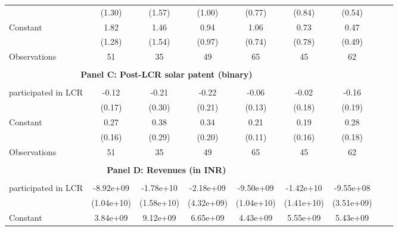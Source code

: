 \begin{table}[htbp]
\begin{tabular}{l*{8}{c}}
                    &      (1.30)         &      (1.57)         &      (1.00)         &      (0.77)         &      (0.84)         &      (0.54)         \\
[1em]
Constant            &        1.82         &        1.46         &        0.94         &        1.06         &        0.73         &        0.47         \\
                    &      (1.28)         &      (1.54)         &      (0.97)         &      (0.74)         &      (0.78)         &      (0.49)         \\
\hline
Observations        &          51         &          35         &          49         &          65         &          45         &          62         \\
\hline \\ \multicolumn{6}{c}{\textbf{Panel C: Post-LCR solar patent (binary)}} \\\\[-1ex]
participated in LCR &       -0.12         &       -0.21         &       -0.22         &       -0.06         &       -0.02         &       -0.16         \\
                    &      (0.17)         &      (0.30)         &      (0.21)         &      (0.13)         &      (0.18)         &      (0.19)         \\
[1em]
Constant            &        0.27\sym{*}  &        0.38         &        0.34\sym{*}  &        0.21\sym{*}  &        0.19         &        0.28         \\
                    &      (0.16)         &      (0.29)         &      (0.20)         &      (0.11)         &      (0.16)         &      (0.18)         \\
\hline
Observations        &          51         &          35         &          49         &          65         &          45         &          62         \\
\hline \\ \multicolumn{6}{c}{\textbf{Panel D: Revenues (in INR)}} \\\\[-1ex]
participated in LCR &   -8.92e+09         &   -1.78e+10         &   -2.18e+09         &   -9.50e+09         &   -1.42e+10         &   -9.55e+08         \\
                    &  (1.04e+10)         &  (1.58e+10)         &  (4.32e+09)         &  (1.04e+10)         &  (1.41e+10)         &  (3.51e+09)         \\
[1em]
Constant            &    3.84e+09         &    9.12e+09         &    6.65e+09         &    4.43e+09         &    5.55e+09         &    5.43e+09\sym{*}  \\

\end{tabular}
\end{table}
